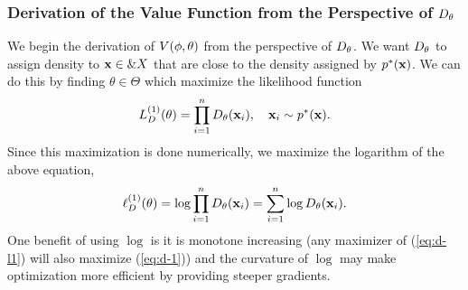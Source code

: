 \subsubsection{Derivation of the Value Function from the Perspective
of $D_\theta$}
\label{sec:derivation-d}

We begin the derivation of $V(\phi, \theta)$ from the perspective of $D_\theta$. We want
$D_\theta$ to assign density to $\mathbf{x} \in \&X$ that are close to the
density assigned by $p^*(\mathbf{x})$. We can do this by finding
$\theta \in \Theta$ which maximize the likelihood function
\begin{align}
  \label{eq:d-1} L_{D}^{(1)}(\theta) = \prod_{i=1}^n D_\theta(\mathbf{x}_i),
  \quad \mathbf{x}_i \sim p^*(\mathbf{x}).
\end{align} Since this maximization is done numerically, we maximize
the logarithm of the above equation,
\begin{align}
  \label{eq:d-l1} \ell_{D}^{(1)}(\theta) = \log \prod_{i=1}^n
  D_\theta(\mathbf{x}_i) = \sum_{i=1}^n \log D_\theta (\mathbf{x}_i).
\end{align} One benefit of using $\log$ is it is monotone increasing
(any maximizer of (\ref{eq:d-l1}) will also maximize (\ref{eq:d-1}))
and the curvature of $\log$ may make optimization more efficient by
providing steeper gradients.

